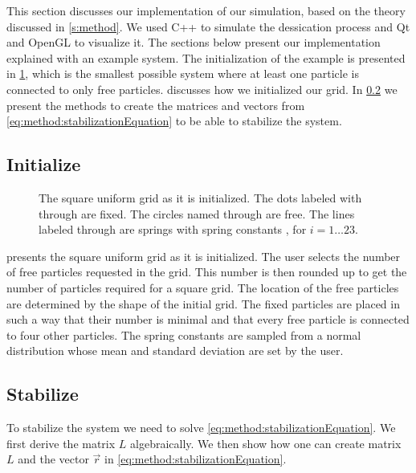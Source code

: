 This section discusses our implementation of our simulation, based on the theory discussed in \cref{s:method}. We used C++ to simulate the dessication process and  Qt\cite{qt} and OpenGL\cite{openGL} to visualize it. The sections below present our implementation explained with an example system. The initialization of the example is presented in \cref{fig:implementation:intitialGrid}, which is the smallest possible system where at least one particle is connected to only free particles.  discusses how we initialized our grid. In \cref{s:implementation:stabilize} we present the methods to create the matrices and vectors from \cref{eq:method:stabilizationEquation} to be able to stabilize the system. 

\subsection{Initialize}
	\label{s:implementation:init}
	\begin{figure}
		\centering
		\resizebox{0.9\columnwidth}{!}{%
			\initialGrid
		}
		\caption{The square uniform grid as it is initialized. The dots labeled with  through  are fixed. The circles named  through  are free. The lines labeled  through  are springs with spring constants , for $i = 1\ldots23$.}
		\label{fig:implementation:intitialGrid}
	\end{figure}

	 presents the square uniform grid as it is initialized. 
	The user selects the number of free particles requested in the grid. This number is then rounded up to get the number of particles required for a square grid. The location of the free particles are determined by the shape of the initial grid.
	The fixed particles are placed  in such a way that their number is minimal and that every free particle is connected to four other particles. 
	The spring constants are sampled from a normal distribution whose mean and standard deviation are set by the user. 

\subsection{Stabilize}
	\label{s:implementation:stabilize}
	To stabilize the system we need to solve \cref{eq:method:stabilizationEquation}. We first derive the matrix $L$ algebraically. We then show how one can create matrix $L$ and the vector $\vec{r}$ in \cref{eq:method:stabilizationEquation}.

